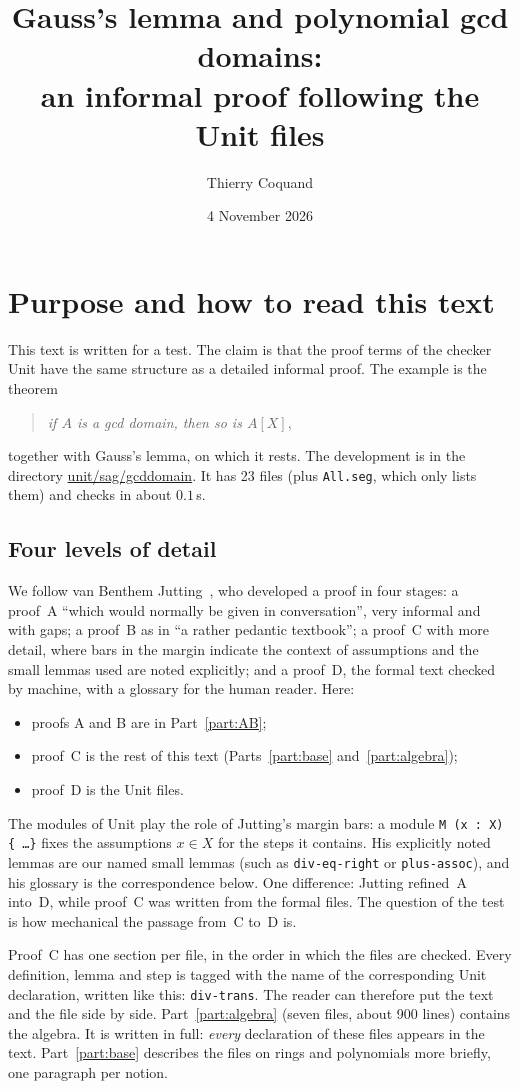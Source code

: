 \documentclass[11pt]{amsart}
\title[Gauss's lemma, file by file]{Gauss's lemma and polynomial gcd domains:\\
an informal proof following the Unit files}
\author{Thierry Coquand}
\date{4 November 2026}
\theoremstyle{definition}
\theoremstyle{remark}
\newcommand{\nm}[1]{\textup{\texttt{#1}}}
\newcommand{\file}[1]{\textup{\texttt{#1.seg}}}
\begin{document}
\maketitle

\section*{Purpose and how to read this text}

This text is written for a test. The claim is that the proof terms
of the checker Unit have the same structure as a detailed informal
proof. The example is the theorem
\begin{quote}
\emph{if $A$ is a gcd domain, then so is $A[X]$},
\end{quote}
together with Gauss's lemma, on which it rests. The development is in
the directory \url{unit/sag/gcddomain}. It has 23 files (plus
\file{All}, which only lists them) and checks in about $0.1$\,s.

\subsection*{Four levels of detail}
We follow van Benthem Jutting~\cite{jutting}, who developed a proof in
four stages: a proof~A ``which would normally be given in conversation'',
very informal and with gaps; a proof~B as in ``a rather pedantic
textbook''; a proof~C with more detail, where bars in the margin indicate
the context of assumptions and the small lemmas used are noted
explicitly; and a proof~D, the formal text checked by machine, with a
glossary for the human reader. Here:
\begin{itemize}
\item proofs A and B are in Part~\ref{part:AB};
\item proof~C is the rest of this text (Parts~\ref{part:base}
  and~\ref{part:algebra});
\item proof~D is the Unit files.
\end{itemize}
The modules of Unit play the role of Jutting's margin bars: a module
\nm{M (x : X) \{ \dots \}} fixes the assumptions $x\in X$ for the steps it
contains. His explicitly noted lemmas are our named small lemmas (such as
\nm{div-eq-right} or \nm{plus-assoc}), and his glossary is the
correspondence below. One difference: Jutting refined~A into~D, while
proof~C was written from the formal files. The question of the test is
how mechanical the passage from~C to~D is.

Proof~C has one section per file, in the order in which the files are
checked. Every definition, lemma and step is tagged with the name of the
corresponding Unit declaration, written like this: \nm{div-trans}. The
reader can therefore put the text and the file side by side.
Part~\ref{part:algebra} (seven files, about 900 lines) contains the
algebra. It is written in full: \emph{every} declaration of these files
appears in the text. Part~\ref{part:base} describes the files on rings and
polynomials more briefly, one paragraph per notion.
\end{document}

